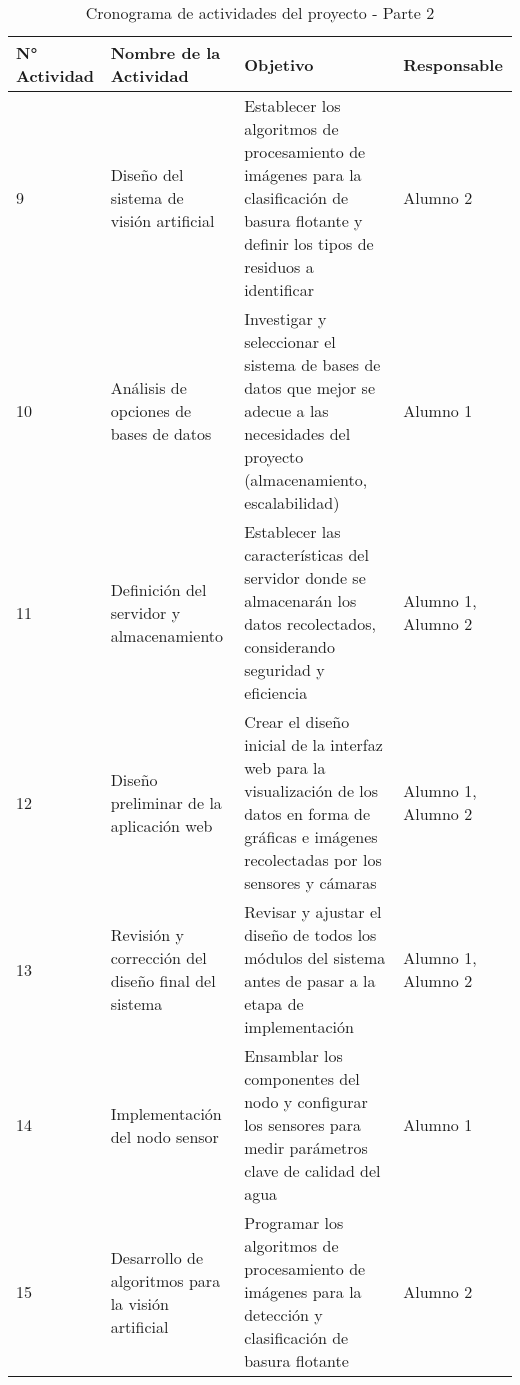 \begin{table}[H]
    \centering
    \renewcommand{\arraystretch}{1.5}
    \begin{tabular}{ |p{1.5cm}|p{5cm}|p{5.5cm}|p{2.5cm}| }

        \hline
        \textbf{N° Actividad} & \textbf{Nombre de la Actividad} & \textbf{Objetivo} & \textbf{Responsable} \\
        \hline

        9 & Diseño del sistema de visión artificial & Establecer los algoritmos de procesamiento de imágenes para la clasificación de basura flotante y definir los tipos de residuos a identificar & Alumno 2 \\\hline
        10 & Análisis de opciones de bases de datos & Investigar y seleccionar el sistema de bases de datos que mejor se adecue a las necesidades del proyecto (almacenamiento, escalabilidad) & Alumno 1 \\\hline
        11 & Definición del servidor y almacenamiento & Establecer las características del servidor donde se almacenarán los datos recolectados, considerando seguridad y eficiencia & Alumno 1, Alumno 2 \\\hline
        12 & Diseño preliminar de la aplicación web & Crear el diseño inicial de la interfaz web para la visualización de los datos en forma de gráficas e imágenes recolectadas por los sensores y cámaras & Alumno 1, Alumno 2 \\\hline
        13 & Revisión y corrección del diseño final del sistema & Revisar y ajustar el diseño de todos los módulos del sistema antes de pasar a la etapa de implementación & Alumno 1, Alumno 2 \\\hline

        14 & Implementación del nodo sensor & Ensamblar los componentes del nodo y configurar los sensores para medir parámetros clave de calidad del agua & Alumno 1 \\\hline
        15 & Desarrollo de algoritmos para la visión artificial & Programar los algoritmos de procesamiento de imágenes para la detección y clasificación de basura flotante & Alumno 2 \\\hline

    \end{tabular}
    \caption{Cronograma de actividades del proyecto - Parte 2}
    \label{tab:cronograma_proyecto_parte2}
\end{table}
